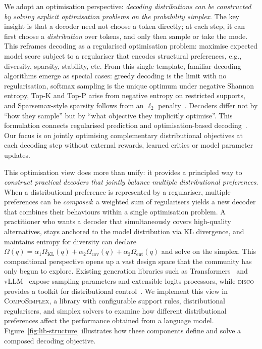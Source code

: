 \documentclass{article} %
\begin{document}
We adopt an optimisation perspective: \emph{decoding distributions can be constructed by solving explicit optimisation problems on the probability simplex}.
The key insight is that a decoder need not choose a token directly; at each step, it can first choose a \emph{distribution} over tokens, and only then sample or take the mode.
This reframes decoding as a regularised optimisation problem: maximise expected model score subject to a regulariser that encodes structural preferences, e.g., diversity, sparsity, stability, etc.
From this single template, familiar decoding algorithms emerge as special cases: greedy decoding is the limit with no regularisation, softmax sampling is the unique optimum under negative Shannon entropy, Top-K and Top-P arise from negative entropy on restricted supports, and Sparsemax-style sparsity follows from an $\ell_2$ penalty~\citep{martins2016softmax}.
Decoders differ not by ``how they sample'' but by ``what objective they implicitly optimise''.
This formulation connects regularised prediction and optimisation-based decoding~\citep{blondel2020fenchel,noarov2025foundations,mudgal2023controlled}. Our focus is on jointly optimising complementary distributional objectives at each decoding step without external rewards, learned critics or model parameter updates.

This optimisation view does more than unify: it provides a principled way to \emph{construct practical decoders that jointly balance multiple distributional preferences}. When a distributional preference is represented by a regulariser, multiple preferences can be \emph{composed}: a weighted sum of regularisers yields a new decoder that combines their behaviours within a single optimisation problem.
A practitioner who wants a decoder that simultaneously covers high-quality alternatives, stays anchored to the model distribution via KL divergence, and maintains entropy for diversity can declare $\Omega(q) = \alpha_1 \Omega_{\mathrm{KL}}(q) + \alpha_2 \Omega_{\mathrm{cov}}(q) + \alpha_3 \Omega_{\mathrm{ent}}(q)$ and solve on the simplex.
This compositional perspective opens up a vast design space that the community has only begun to explore.
Existing generation libraries such as Transformers~\citep{wolf2019huggingface} and vLLM~\citep{kwon2023efficient} expose sampling parameters and extensible logits processors, while \textsc{disco} provides a toolkit for distributional control~\citep{kruszewski2023disco}. 
We implement this view in \textsc{CompoSimplex}, a library with configurable support rules, distributional regularisers, and simplex solvers to examine how different distributional preferences affect the performance obtained from a language model. Figure~\ref{fig:lib-structure} illustrates how these components define and solve a composed decoding objective. 
\end{document}
